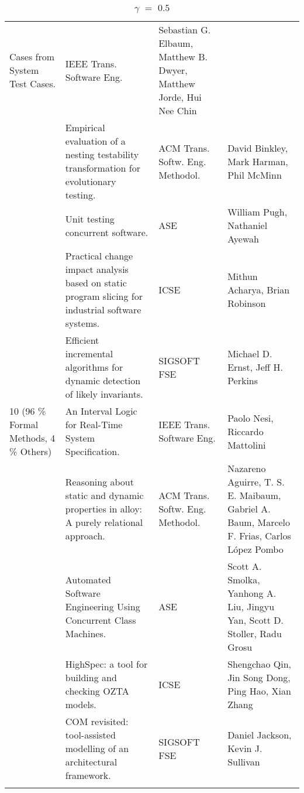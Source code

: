 \begin{center}
\begin{longtable}{|p{}p{}p{}p{}|}
Cases from System Test Cases.& 
IEEE Trans. Software Eng.& Sebastian G. Elbaum, Matthew B. Dwyer, Matthew Jorde, Hui Nee Chin \\
 & Empirical evaluation of a nesting testability transformation for evolutionary testing.& ACM 
Trans. Softw. Eng. Methodol.& David Binkley, Mark Harman, Phil McMinn \\
\rowcolor{black!20} & Unit testing concurrent software.& ASE& William Pugh, Nathaniel Ayewah \\
 & Practical change impact analysis based on static program slicing for industrial software 
systems.& ICSE& Mithun Acharya, Brian Robinson \\
\rowcolor{black!20} & Efficient incremental algorithms for dynamic detection of likely invariants.& 
SIGSOFT FSE& Michael D. Ernst, Jeff H. Perkins \\
10 (96 \% Formal Methods, 4 \% Others) & An Interval Logic for Real-Time System Specification.& 
IEEE Trans. Software Eng.& Paolo Nesi, 
Riccardo Mattolini \\
\rowcolor{black!20} & Reasoning about static and dynamic properties in alloy: A purely relational 
approach.& ACM Trans. Softw. Eng. Methodol.& Nazareno Aguirre, T. S. E. Maibaum, Gabriel A. Baum, 
Marcelo F. Frias, Carlos López Pombo \\
 & Automated Software Engineering Using Concurrent Class Machines.& ASE& Scott A. Smolka, Yanhong A. 
Liu, Jingyu Yan, Scott D. Stoller, Radu Grosu \\
\rowcolor{black!20} & HighSpec: a tool for building and checking OZTA models.& ICSE& Shengchao Qin, 
Jin Song Dong, Ping Hao, Xian Zhang \\
 & COM revisited: tool-assisted modelling of an architectural framework.& SIGSOFT FSE& Daniel 
Jackson, Kevin J. Sullivan \\
    \hline
    \caption {$\gamma$ $=$ $0.5$}
\end{longtable}
\end{center}